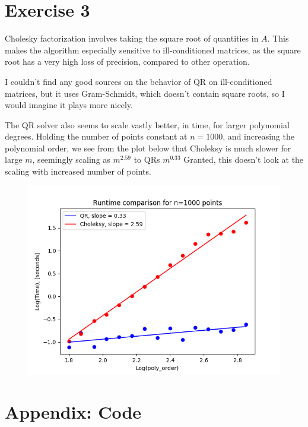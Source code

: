 \documentclass[12p,a4paper]{article}
\begin{document}
\section*{Exercise 3}

Cholesky factorization involves taking the square root of quantities in $A$. This makes the algorithm especially sensitive to ill-conditioned matrices, as the square root has a very high loss of precision, compared to other operation.

I couldn't find any good sources on the behavior of QR on ill-conditioned matrices, but it uses Gram-Schmidt, which doesn't contain square roots, so I would imagine it plays more nicely.

The QR solver also seems to scale vastly better, in time, for larger polynomial degrees. Holding the number of points constant at $n=1000$, and increasing the polynomial order, we see from the plot below that Choleksy is much slower for large $m$, seemingly scaling as $m^{2.59}$ to QRs $m^{0.33}$ Granted, this doesn't look at the scaling with increased number of points.

\begin{figure}[H]
    \includegraphics[width=0.80\linewidth]{../plots/timings.png}
\end{figure}


\section*{Appendix: Code}

\pagebreak



\pagebreak



\pagebreak



\pagebreak


\end{document}
